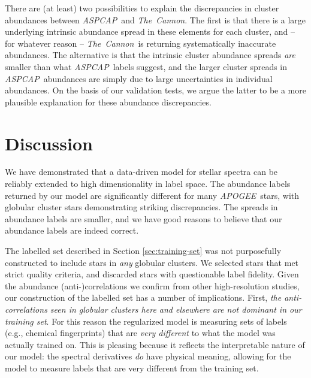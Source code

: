 \documentclass[12pt,preprint]{aastex}
\newcommand{\project}[1]{\textsl{#1}}
\newcommand{\TheCannon}{\project{The~Cannon}}
\newcommand{\acronym}[1]{{\small{#1}}}
\newcommand{\apogee}{\project{\acronym{APOGEE}}}
\newcommand{\aspcap}{\project{\acronym{ASPCAP}}}
\begin{document}
There are (at least) two possibilities to explain the discrepancies in
cluster abundances between \aspcap\ and \TheCannon.  The first is that
there is a large underlying intrinsic abundance spread in these elements
for each cluster, and -- for whatever reason -- \TheCannon\ is returning
systematically inaccurate abundances.  The alternative is that the
intrinsic cluster abundance spreads \emph{are} smaller than what \aspcap\
labels suggest, and the larger cluster spreads in \aspcap\ abundances are
simply due to large uncertainties in individual abundances.  On the basis
of our validation tests, we argue the latter to be a more plausible
explanation for these abundance discrepancies.


\section{Discussion}
\label{sec:discussion}


We have demonstrated that a data-driven model for stellar spectra can be
reliably extended to high dimensionality in label space.  The abundance
labels returned by our model are significantly different for many
\apogee\ stars, with globular cluster stars demonstrating striking 
discrepancies.  The spreads in abundance labels are smaller, and we have
good reasons to believe that our abundance labels are indeed correct.




The labelled set described in Section \ref{sec:training-set} was not
purposefully constructed to include stars in \emph{any} globular
clusters.  We selected stars that met strict quality criteria, and
discarded stars with questionable label fidelity.  Given the
abundance (anti-)correlations we confirm from other high-resolution
studies, our construction of the labelled set has a number of
implications.  First, \emph{the anti-correlations seen in globular 
clusters here and elsewhere are not dominant in our training set}.  
For this reason the regularized model is measuring sets
of labels (e.g., chemical fingerprints) that are \emph{very different}
to what the model was actually trained on.  This is pleasing because
it reflects the interpretable nature of our model: the spectral
derivatives \emph{do} have physical meaning, allowing for the model
to measure labels that are very different from the training set.
\end{document}
